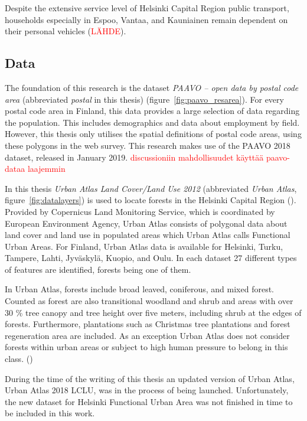 Despite the extensive service level of Helsinki Capital Region public transport, households especially in Espoo, Vantaa, and Kauniainen remain dependent on their personal vehicles (\textcolor{red}{LÄHDE}). 

\subsection{Data}
\justify

The foundation of this research is the dataset \textit{PAAVO -- open data by postal code area} (abbreviated \textit{postal} in this thesis) (figure~\ref{fig:paavo_resarea}). For every postal code area in Finland, this data provides a large selection of data regarding the population. This includes demographics and data about employment by field. However, this thesis only utilises the spatial definitions of postal code areas, using these polygons in the web survey. This research makes use of the PAAVO 2018 dataset, released in January 2019. \textcolor{red}{discussioniin mahdollisuudet käyttää paavo-dataa laajemmin}

In this thesis \textit{Urban Atlas Land Cover/Land Use 2012} (abbreviated \textit{Urban Atlas}, figure~\ref{fig:datalayers}) is used to locate forests in the Helsinki Capital Region (\cite{EuropeanEnvironmentAgency2016}). Provided by Copernicus Land Monitoring Service, which is coordinated by European Environment Agency, Urban Atlas consists of polygonal data about land cover and land use in populated areas which Urban Atlas calls Functional Urban Areas. For Finland, Urban Atlas data is available for Helsinki, Turku, Tampere, Lahti, Jyväskylä, Kuopio, and Oulu. In each dataset 27 different types of features are identified, forests being one of them.

In Urban Atlas, forests include broad leaved, coniferous, and mixed forest. Counted as forest are also transitional woodland and shrub and areas with over 30 \% tree canopy and tree height over five meters, including shrub at the edges of forests. Furthermore, plantations such as Christmas tree plantations and forest regeneration area are included. As an exception Urban Atlas does not consider forests within urban areas or subject to high human pressure to belong in this class. (\cite{CopernicusLandMonitoringService2016})

During the time of the writing of this thesis an updated version of Urban Atlas, Urban Atlas 2018 LCLU, was in the process of being launched. Unfortunately, the new dataset for Helsinki Functional Urban Area was not finished in time to be included in this work.

